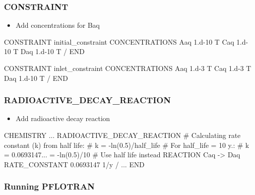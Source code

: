 \documentclass{beamer}
\newcommand\bluecomment[1]{{{\color{blue} #1}}}
\newcommand\magentacomment[1]{{{\color{magenta} #1}}}
\begin{document}
\begin{frame}[fragile]\frametitle{CONSTRAINT}

\begin{itemize}
  \item Add concentrations for Baq
\end{itemize}

\begin{semiverbatim}

CONSTRAINT initial_constraint
  CONCENTRATIONS
    Aaq   1.d-10   T
    \magentacomment{Caq   1.d-10   T}
    \magentacomment{Daq   1.d-10   T}
  /
END

CONSTRAINT inlet_constraint
  CONCENTRATIONS
    Aaq   1.d-3    T
    \magentacomment{Caq   1.d-3    T}
    \magentacomment{Daq   1.d-10   T}
  /
END

\end{semiverbatim}

\end{frame}

\begin{frame}\frametitle{RADIOACTIVE\_DECAY\_REACTION}

\begin{itemize}
  \item Add radioactive decay reaction
\end{itemize}

\begin{semiverbatim}

CHEMISTRY
  ...
  \magentacomment{RADIOACTIVE_DECAY_REACTION}
    \bluecomment{# Calculating rate constant (k) from half life:}
    \bluecomment{#   k = -ln(0.5)/half_life}
    \bluecomment{# For half_life = 10 y.:}
    \bluecomment{#   k = 0.0693147... = -ln(0.5)/10}
    \bluecomment{# Use half life instead}
    \magentacomment{REACTION Caq -> Daq}
    \magentacomment{RATE_CONSTANT 0.0693147 1/y}
  \magentacomment{/}
  ...
END
\end{semiverbatim}

\end{frame}

\begin{frame}[fragile]\frametitle{Running PFLOTRAN}


\end{frame}
\end{document}
